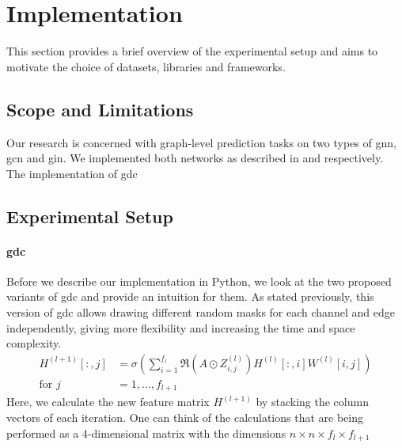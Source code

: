 \chapter{Implementation}
\label{sec:implement}

This section provides a brief overview of the experimental setup and aims to motivate the choice of datasets, libraries and frameworks.

\section{Scope and Limitations}
\label{sec:implement:scope}
Our research is concerned with graph-level prediction tasks on two types of \ac{gnn}, \ac{gcn} and \ac{gin}.
We implemented both networks as described in \cite{} and \cite{} respectively.
The implementation of \ac{gdc}





\section{Experimental Setup}
\label{sec:implement:setup}
\subsubsection{\Ac{gdc}}
Before we describe our implementation in Python, we look at the two proposed variants of \ac{gdc} and provide an intuition for them.
As stated previously, this version of \ac{gdc} allows drawing different random masks for each channel and edge independently, giving more flexibility and increasing the time and space complexity.
\begin{align*}
    H^{(l+1)}[:,j] & = \sigma \left(\sum_{i=1}^{f_{l}}\mathfrak{R}\left(A \odot Z_{i,j}^{(l)}\right)H^{(l)}[:,i]W^{(l)}[i,j]\right) \\
    \text{for } j  & = 1,..., f_{l+1}
\end{align*}
Here, we calculate the new feature matrix $H^{(l+1)}$ by stacking the column vectors of each iteration. One can think of the calculations that are being performed as a $4$-dimensional matrix with the dimensions $n\times n\times f_{l}\times f_{l+1}$

